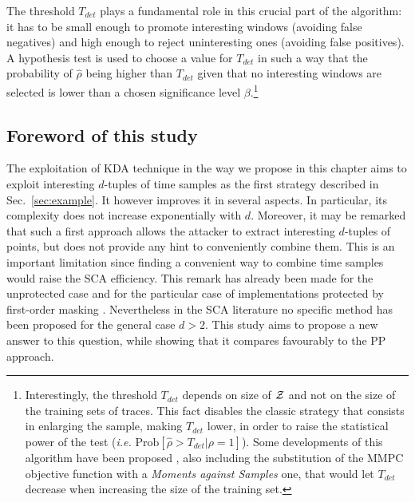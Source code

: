 The threshold $T_{det}$ plays a fundamental role in this crucial part of the algorithm: it has to be small enough to promote interesting windows (avoiding false negatives) and high enough to reject uninteresting ones (avoiding false positives). A hypothesis test is used to choose a value for $T_{det}$ in such a way that the probability of $\hat{\rho}$ being higher than $T_{det}$ given that no interesting windows are selected is lower than a chosen significance level $\beta$.\footnote{Interestingly, the threshold $T_{det}$ depends on size of $\mathcal{Z}$ and not on the size of the training sets of traces. This fact disables the classic strategy that consists in enlarging the sample, making $T_{det}$ lower, in order to raise the statistical power of the test (\emph{i.e.} $\mathrm{Prob}[\hat{\rho}>T_{det}\vert \rho=1]$). Some developments of this algorithm have been proposed \cite{durvauximproved}, also including the substitution of the MMPC objective function with a \emph{Moments against Samples} one, that would let $T_{det}$ decrease when increasing the size of the training set.} \\

\subsection{Foreword of this study}

The exploitation of KDA technique in the way we propose in this chapter aims to exploit interesting $d$-tuples of time samples as the first strategy described in Sec.~\ref{sec:example}. It however improves it in several aspects. In particular, its complexity does not increase exponentially with $d$. Moreover, it may be remarked that such a first approach allows the attacker to extract interesting $d$-tuples of points, but does not provide any hint to conveniently combine them. This is an important limitation since  finding a convenient way to combine time samples would raise the SCA efficiency. This remark has already been made for the unprotected case and for the particular case of implementations protected by first-order masking \cite{boosting}. Nevertheless in the SCA literature no specific method has been proposed for the general case $d>2$.  This study aims to propose a new answer to this question, while showing that it compares favourably to the PP approach.

